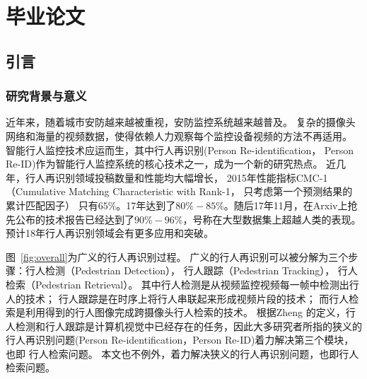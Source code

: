 ﻿%

%
\part{毕业论文}

\chapter{引言}

\section{研究背景与意义}

近年来，随着城市安防越来越被重视，安防监控系统越来越普及。
复杂的摄像头网络和海量的视频数据，使得依赖人力观察每个监控设备视频的方法不再适用。
智能行人监控技术应运而生，其中行人再识别(Person Re-identification， Person Re-ID)作为智能行人监控系统的核心技术之一，成为一个新的研究热点。
近几年，行人再识别领域投稿数量和性能均大幅增长，
2015年性能指标CMC-1（Cumulative Matching Characteristic with Rank-1， 只考虑第一个预测结果的累计匹配因子）
只有$65\%$。17年达到了$80\%-85\%$。随后17年11月，在Arxiv上抢先公布的技术报告已经达到了$90\%-96\%$，号称在大型数据集上超越人类的表现。预计18年行人再识别领域会有更多应用和突破。

图~\ref{fig:overall}为广义的行人再识别过程。
广义的行人再识别可以被分解为三个步骤：行人检测（Pedestrian Detection），
行人跟踪（Pedestrian Tracking），
行人检索（Pedestrian Retrieval）。
其中行人检测是从视频监控视频每一帧中检测出行人的技术；
行人跟踪是在时序上将行人串联起来形成视频片段的技术；
而行人检索是利用得到的行人图像完成跨摄像头行人检索的技术。
根据Zheng \etal \cite{zheng2017person}的定义，行人检测和行人跟踪是计算机视觉中已经存在的任务，因此大多研究者所指的狭义的行人再识别问题(Person Re-identification，Person Re-ID)着力解决第三个模块，也即
行人检索问题。
本文也不例外，着力解决狭义的行人再识别问题，也即行人检索问题。

